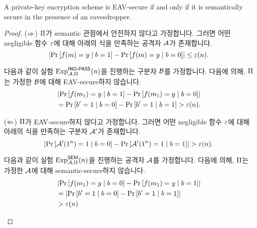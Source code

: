 \begin{theorem}
  A private-key encryption scheme is EAV-secure if and only if it is
  semantically secure in the presence of an eavesdropper.
  \label{thm:ind_pass_iff_sem}
\end{theorem}

\begin{proof}
  ($\rif$) $\sch$가 semantic 관점에서 안전하지 않다고 가정합니다. 그러면 어떤
  negligible 함수 $\negl$에 대해 아래의 식을 만족하는 공격자 $\adv$가
  존재합니다.
  \begin{equation}
    \abs{\pr{f(m) = y \when b = 1} - \pr{f(m) = y \when b = 0}} \le \negl(n).
  \end{equation}

  다음과 같이 실험 $\expeav_{\adv, \sch}(n)$을 진행하는 구분자 $\advp$를 가정합니다.
  다음에 의해, $\sch$는 가정한 $\advp$에 대해 EAV-secure하지 않습니다.
  \begin{equation}
    \begin{split}
      &\abs{\pr{f(m_1) = y \when b = 1} - \pr{f(m_1) = y \when b = 0}} \\
      &= \pr{b' = 1 \when b = 0} - \pr{b' = 1 \when b = 1} > \negl(n).
    \end{split}
  \end{equation}

  ($\lif$) $\sch$가 EAV-secure하지 않다고 가정합니다. 그러면 어떤 negligible 함수 $\negl$에 대해 아래의 식을 만족하는 구분자 $\adv'$가 존재합니다.
  \begin{equation}
    \abs{
      \pr{\adv'(1^{\klen}) = 1 \when b = 0} - \pr{\adv'(1^{\klen}) = 1 \when b = 1}
    } > \negl(n).
  \end{equation}

  다음과 같이 실험 $\expsem_{\adv, \sch}(n)$을 진행하는 공격자 $\adv$를
  가정합니다. 다음에 의해, $\sch$는 가정한 $\adv$에 대해 semantic-secure하지
  않습니다.
  \begin{equation}
    \begin{split}
      &\abs{\pr{f(m_1) = y \when b = 0} - \pr{f(m_1) = y \when b = 1}} \\
      &= \abs{\pr{b' = 1 \when b = 0} - \pr{b' = 1 \when b = 1}} \\
      &> \negl(\klen)
    \end{split}
  \end{equation}

  \newpage
  \begin{figure}[ht]
    \centering
    \begin{tikzpicture}
      [inner sep=0.5cm, every text node part/.style={align=center}]


\end{tikzpicture}
\end{figure}
\end{proof}
